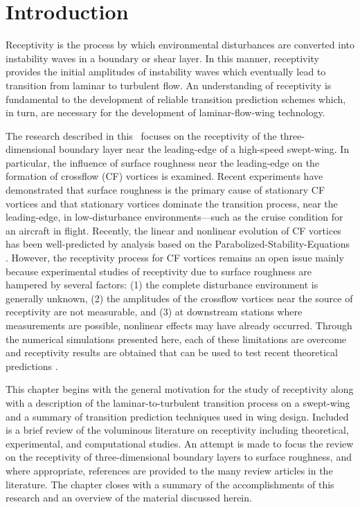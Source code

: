 %
%
%
%
%
\chapter{Introduction \label{c:intro}}

Receptivity is the process by which environmental disturbances are converted
into instability waves in a boundary or shear layer.  In this manner,
receptivity provides the initial amplitudes of instability waves which
eventually lead to transition from laminar to turbulent flow.  An
understanding of receptivity is fundamental to the development of reliable
transition prediction schemes which, in turn, are necessary for the
development of laminar-flow-wing technology.

The research described in this \thesis\ focuses on the receptivity of the
three-dimensional boundary layer near the leading-edge of a high-speed
swept-wing.  In particular, the influence of surface roughness near the
leading-edge on the formation of crossflow (CF) vortices is examined.  Recent
experiments \cite{ReSaCaCh:96,DeBi:96} have demonstrated that surface
roughness is the primary cause of stationary CF vortices and that stationary
vortices dominate the transition process, near the leading-edge, in
low-disturbance environments---such as the cruise condition for an aircraft in
flight.  Recently, the linear and nonlinear evolution of CF vortices has been
well-predicted by analysis based on the Parabolized-Stability-Equations
\cite{HaRe:96,MaLiCh:94}.  However, the receptivity process for CF vortices
remains an open issue mainly because experimental studies of receptivity due
to surface roughness are hampered by several factors: (1) the complete
disturbance environment is generally unknown, (2) the amplitudes of the
crossflow vortices near the source of receptivity are not measurable, and (3)
at downstream stations where measurements are possible, nonlinear effects may
have already occurred.  Through the numerical simulations presented here, each
of these limitations are overcome and receptivity results are obtained that
can be used to test recent theoretical predictions
\cite{Choudhari:94,Crouch:93}.

This chapter begins with the general motivation for the study of receptivity
along with a description of the laminar-to-turbulent transition process on a
swept-wing and a summary of transition prediction techniques used in wing
design.  Included is a brief review of the voluminous literature on
receptivity including theoretical, experimental, and computational studies.
An attempt is made to focus the review on the receptivity of three-dimensional
boundary layers to surface roughness, and where appropriate, references are
provided to the many review articles in the literature.  The chapter closes
with a summary of the accomplishments of this research and an overview of the
material discussed herein.

